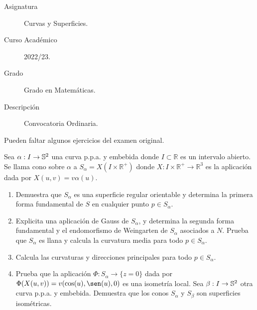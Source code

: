 \documentclass[12pt]{article}
\begin{document}

    
    

    \begin{description}
        \item[Asignatura] Curvas y Superficies.
        \item[Curso Académico] 2022/23.
        \item[Grado] Grado en Matemáticas.
        \item[Descripción] Convocatoria Ordinaria.
    \end{description}
    \newpage



    \noindent
    Pueden faltar algunos ejercicios del examen original.
    
    \begin{ejercicio}
        Sea $\alpha:I\to\mathbb{S}^2$ una curva p.p.a. y embebida donde $I\subset\mathbb{R}$ es un intervalo abierto. Se llama cono sobre $\alpha$ a $S_\alpha = X(I\times \mathbb{R}^+)$ donde $X:I\times\mathbb{R}^+\to\mathbb{R}^3$ es la aplicación dada por $X(u,v) = v\alpha(u)$.
        \begin{enumerate}[label=\alph*)]
            \item Demuestra que $S_\alpha$ es una superficie regular orientable y determina la primera forma fundamental de $S$ en cualquier punto $p\in S_\alpha$.
            \item Explicita una aplicación de Gauss de $S_\alpha$, y determina la segunda forma fundamental y el endomorfismo de Weingarten de $S_\alpha$ asociados a $N$. Prueba que $S_\alpha$ es llana y calcula la curvatura media para todo $p\in S_\alpha$.
            \item Calcula las curvaturas y direcciones principales para todo $p\in S_\alpha$.
            \item Prueba que la aplicación $\Phi:S_\alpha\to \{z=0\}$ dada por $\Phi(X(u,v)) = v(\cos(u),\sen(u),0)$ es una isometría local. Sea $\beta:I\to\mathbb{S}^2$ otra curva p.p.a. y embebida. Demuestra que los conos $S_\alpha$ y $S_\beta$ son superficies isométricas.
        \end{enumerate}
    \end{ejercicio}
\end{document}
